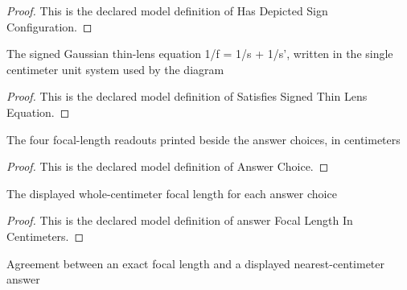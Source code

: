 \begin{proof}
  This is the declared model definition of Has Depicted Sign Configuration.
\end{proof}
\begin{definition}
  \label{def:physics:phyx-mini-0044:phyxminiproblems-problemphyxmini0044-satisfiessignedthinlensequation}
  The signed Gaussian thin-lens equation 1/f = 1/s + 1/s', written in the single centimeter unit system used by the diagram
\end{definition}
\begin{proof}
  This is the declared model definition of Satisfies Signed Thin Lens Equation.
\end{proof}
\begin{definition}
  \label{def:physics:phyx-mini-0044:phyxminiproblems-problemphyxmini0044-answerchoice}
  The four focal-length readouts printed beside the answer choices, in centimeters
\end{definition}
\begin{proof}
  This is the declared model definition of Answer Choice.
\end{proof}
\begin{definition}
  \label{def:physics:phyx-mini-0044:phyxminiproblems-problemphyxmini0044-answerfocallengthincentimeters}
  The displayed whole-centimeter focal length for each answer choice
\end{definition}
\begin{proof}
  This is the declared model definition of answer Focal Length In Centimeters.
\end{proof}
\begin{definition}
  \label{def:physics:phyx-mini-0044:phyxminiproblems-problemphyxmini0044-matchesanswertonearestcentimeter}
  Agreement between an exact focal length and a displayed nearest-centimeter answer
\end{definition}
